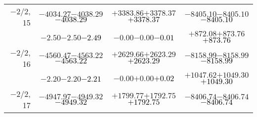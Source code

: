 \documentclass[compress]{beamer}
\begin{document}
\begin{frame}
{\begin{tabular}{r | c | c | c}
$-$2/2, 15 & $-4034.27$\hspace{0.1 cm}$-4038.29$\hspace{0.1 cm}\textcolor{black}{$-4038.29$} & $+3383.86$\hspace{0.1 cm}$+3378.37$\hspace{0.1 cm}\textcolor{black}{$+3378.37$} & $-8405.10$\hspace{0.1 cm}$-8405.10$\hspace{0.1 cm}\textcolor{black}{$-8405.10$} \\
           & $-2.50$\hspace{0.1 cm}$-2.50$\hspace{0.1 cm}\textcolor{black}{$-2.49$} & $-0.00$\hspace{0.1 cm}$-0.00$\hspace{0.1 cm}\textcolor{black}{$-0.01$} & $+872.08$\hspace{0.1 cm}$+873.76$\hspace{0.1 cm}\textcolor{black}{$+873.76$} \\
$-$2/2, 16 & $-4560.47$\hspace{0.1 cm}$-4563.22$\hspace{0.1 cm}\textcolor{black}{$-4563.22$} & $+2629.66$\hspace{0.1 cm}$+2623.29$\hspace{0.1 cm}\textcolor{black}{$+2623.29$} & $-8158.99$\hspace{0.1 cm}$-8158.99$\hspace{0.1 cm}\textcolor{black}{$-8158.99$} \\
           & $-2.20$\hspace{0.1 cm}$-2.20$\hspace{0.1 cm}\textcolor{black}{$-2.21$} & $-0.00$\hspace{0.1 cm}$+0.00$\hspace{0.1 cm}\textcolor{black}{$+0.02$} & $+1047.62$\hspace{0.1 cm}$+1049.30$\hspace{0.1 cm}\textcolor{black}{$+1049.30$} \\
$-$2/2, 17 & $-4947.97$\hspace{0.1 cm}$-4949.32$\hspace{0.1 cm}\textcolor{black}{$-4949.32$} & $+1799.77$\hspace{0.1 cm}$+1792.75$\hspace{0.1 cm}\textcolor{black}{$+1792.75$} & $-8406.74$\hspace{0.1 cm}$-8406.74$\hspace{0.1 cm}\textcolor{black}{$-8406.74$} \\

\end{tabular}}
\end{frame}
\end{document}
